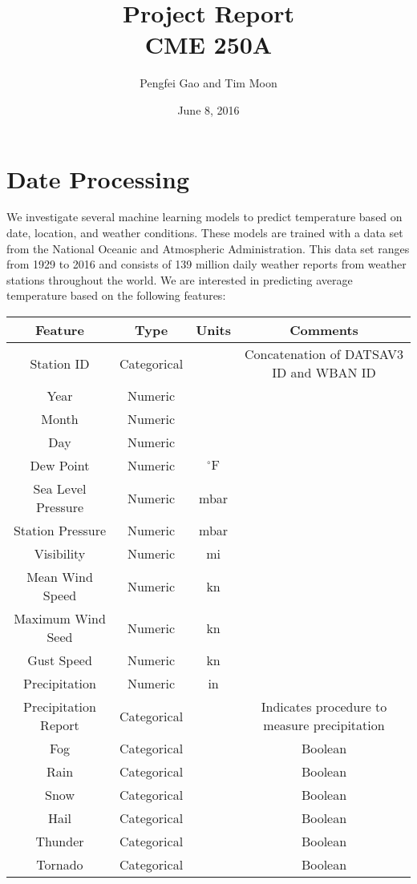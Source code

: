 \documentclass[letterpaper]{article}
\begin{document}
\title{Project Report\\\small CME 250A}
\author{Pengfei Gao and Tim Moon}
\date{June 8, 2016}
\maketitle

\section{Date Processing}
We investigate several machine learning models to predict temperature
based on date, location, and weather conditions. These models are
trained with a data set from the National Oceanic and Atmospheric
Administration. This data set ranges from 1929 to 2016 and consists of
139 million daily weather reports from weather stations throughout the
world. We are interested in predicting average temperature based on
the following features:
\begin{table}[H]
  \centering
  \begin{tabular}{c|ccc}
    Feature & Type & Units & Comments \\ \hline
    Station ID & Categorical & & Concatenation of DATSAV3 ID and WBAN ID \\
    Year & Numeric & & \\
    Month & Numeric & & \\
    Day & Numeric & & \\
    Dew Point & Numeric & \({}^\circ\text{F}\) & \\
    Sea Level Pressure & Numeric & mbar & \\
    Station Pressure & Numeric & mbar & \\
    Visibility & Numeric & mi & \\
    Mean Wind Speed & Numeric & kn & \\
    Maximum Wind Seed & Numeric & kn & \\
    Gust Speed & Numeric & kn \\
    Precipitation & Numeric & in \\
    Precipitation Report & Categorical & & Indicates procedure to measure precipitation \\
    Fog & Categorical & & Boolean \\
    Rain & Categorical & & Boolean \\
    Snow & Categorical & & Boolean \\
    Hail & Categorical & & Boolean \\
    Thunder & Categorical & & Boolean \\
    Tornado & Categorical & & Boolean 
  \end{tabular}
\end{table}
\end{document}
